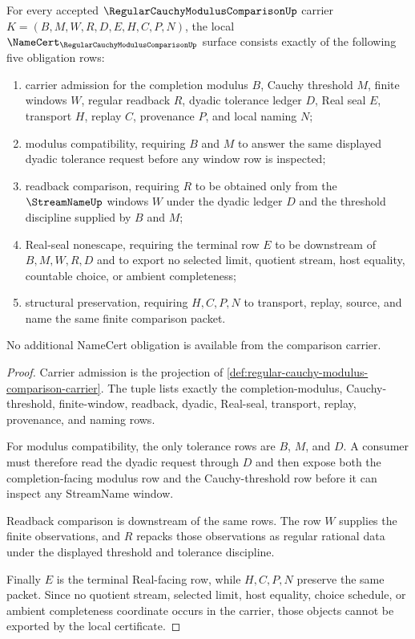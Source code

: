 \begin{theorem}
\label{thm:regular-cauchy-modulus-comparison-namecert-obligations}
For every accepted $\RegularCauchyModulusComparisonUp$ carrier $K=(B,M,W,R,D,E,H,C,P,N)$, the local $\NameCert_{\RegularCauchyModulusComparisonUp}$ surface consists exactly of the following five obligation rows:
\begin{enumerate}
\item carrier admission for the completion modulus $B$, Cauchy threshold $M$, finite windows $W$, regular readback $R$, dyadic tolerance ledger $D$, Real seal $E$, transport $H$, replay $C$, provenance $P$, and local naming $N$;
\item modulus compatibility, requiring $B$ and $M$ to answer the same displayed dyadic tolerance request before any window row is inspected;
\item readback comparison, requiring $R$ to be obtained only from the $\StreamNameUp$ windows $W$ under the dyadic ledger $D$ and the threshold discipline supplied by $B$ and $M$;
\item Real-seal nonescape, requiring the terminal row $E$ to be downstream of $B,M,W,R,D$ and to export no selected limit, quotient stream, host equality, countable choice, or ambient completeness;
\item structural preservation, requiring $H,C,P,N$ to transport, replay, source, and name the same finite comparison packet.
\end{enumerate}
No additional NameCert obligation is available from the comparison carrier.
\end{theorem}
\begin{proof}
Carrier admission is the projection of \autoref{def:regular-cauchy-modulus-comparison-carrier}. The tuple lists exactly the completion-modulus, Cauchy-threshold, finite-window, readback, dyadic, Real-seal, transport, replay, provenance, and naming rows.

For modulus compatibility, the only tolerance rows are $B$, $M$, and $D$. A consumer must therefore read the dyadic request through $D$ and then expose both the completion-facing modulus row and the Cauchy-threshold row before it can inspect any StreamName window.

Readback comparison is downstream of the same rows. The row $W$ supplies the finite observations, and $R$ repacks those observations as regular rational data under the displayed threshold and tolerance discipline.

Finally $E$ is the terminal Real-facing row, while $H,C,P,N$ preserve the same packet. Since no quotient stream, selected limit, host equality, choice schedule, or ambient completeness coordinate occurs in the carrier, those objects cannot be exported by the local certificate.
\end{proof}

